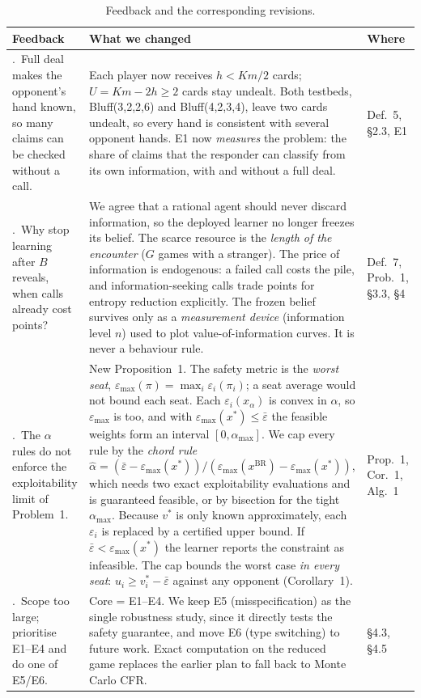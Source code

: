 \documentclass[11pt]{article}
\newcommand{\eps}{\varepsilon}
\newcommand{\epsbar}{\bar{\eps}}
\newcommand{\emax}{\eps_{\max}}
\newcommand{\BR}{\mathrm{BR}}
\begin{document}
\begin{table}[h]
\centering\small
\begin{tabularx}{\linewidth}{@{}>{\raggedright\arraybackslash}p{3.6cm}X>{\raggedright\arraybackslash}p{1.8cm}@{}}
\toprule
Feedback & What we changed & Where\\
\midrule
1.\ Full deal makes the opponent's hand known, so many claims can be checked without a call. &
Each player now receives $h<Km/2$ cards; $U=Km-2h\ge 2$ cards stay undealt. Both testbeds, Bluff(3,2,2,6) and Bluff(4,2,3,4), leave two cards undealt, so every hand is consistent with several opponent hands. E1 now \emph{measures} the problem: the share of claims that the responder can classify from its own information, with and without a full deal. &
Def.~5, \S2.3, E1\\[3pt]
2.\ Why stop learning after $B$ reveals, when calls already cost points? &
We agree that a rational agent should never discard information, so the deployed learner no longer freezes its belief. The scarce resource is the \emph{length of the encounter} ($G$ games with a stranger). The price of information is endogenous: a failed call costs the pile, and information-seeking calls trade points for entropy reduction explicitly. The frozen belief survives only as a \emph{measurement device} (information level $n$) used to plot value-of-information curves. It is never a behaviour rule. &
Def.~7, Prob.~1, \S3.3, \S4\\[3pt]
3.\ The $\alpha$ rules do not enforce the exploitability limit of Problem~1. &
New Proposition~1. The safety metric is the \emph{worst seat}, $\emax(\pi)=\max_i\eps_i(\pi_i)$; a seat average would not bound each seat. Each $\eps_i(x_\alpha)$ is convex in $\alpha$, so $\emax$ is too, and with $\emax(x^*)\le\epsbar$ the feasible weights form an interval $[0,\alpha_{\max}]$. We cap every rule by the \emph{chord rule} $\hat\alpha=(\epsbar-\emax(x^*))/(\emax(x^{\BR})-\emax(x^*))$, which needs two exact exploitability evaluations and is guaranteed feasible, or by bisection for the tight $\alpha_{\max}$. Because $v^*$ is only known approximately, each $\eps_i$ is replaced by a certified upper bound. If $\epsbar<\emax(x^*)$ the learner reports the constraint as infeasible. The cap bounds the worst case \emph{in every seat}: $u_i\ge v_i^*-\epsbar$ against any opponent (Corollary~1). &
Prop.~1, Cor.~1, Alg.~1\\[3pt]
4.\ Scope too large; prioritise E1--E4 and do one of E5/E6. &
Core = E1--E4. We keep E5 (misspecification) as the single robustness study, since it directly tests the safety guarantee, and move E6 (type switching) to future work. Exact computation on the reduced game replaces the earlier plan to fall back to Monte Carlo CFR. &
\S4.3, \S4.5\\
\bottomrule
\end{tabularx}
\caption{Feedback and the corresponding revisions.}\label{tab:resp}
\end{table}
\end{document}
